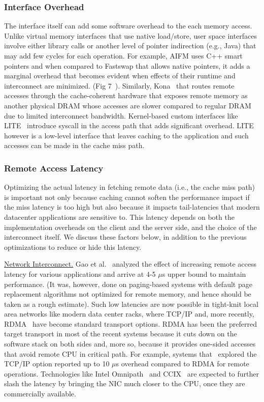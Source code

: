 \subsubsection{Interface Overhead}
The interface itself can add some software overhead 
to the each memory access. Unlike virtual memory 
interfaces that use native load/store, user space 
interfaces involve either library calls or another 
level of pointer indirection (e.g., Java) that may add 
few cycles for each operation. For example, AIFM uses
C++ smart pointers and when compared to Fastswap that 
allows native pointers, it adds a marginal overhead 
that becomes evident when effects of their runtime and 
interconnect are minimized. (Fig 7~\cite{aifm}). 
Similarly, Kona~\cite{kona} that routes remote accesses
through the cache-coherent hardware that exposes remote 
memory as another physical DRAM whose accesses are 
slower compared to regular DRAM due to limited interconnect 
bandwidth. Kernel-based custom interfaces like 
LITE~\cite{literdma} introduce syscall in the access path 
that adds significant overhead. LITE however is a low-level 
interface that leaves caching to the application and 
such accesses can be made in the cache miss path. 


\subsubsection{Remote Access Latency} 
Optimizing the actual latency in fetching remote data 
(i.e., the cache miss path) is important not only because 
caching cannot soften the performance impact if the miss 
latency is too high but also because it impacts tail-latencies 
that modern datacenter applications are sensitive to. 
This latency depends on both the implementation 
overheads on the client and the server side, and the choice of 
the interconnect itself. We discuss these factors below, 
in addition to the previous optimizations to reduce or 
hide this latency.

\vspace{3pt}
\noindent \uline{Network Interconnect.}
Gao et al.~\cite{netdisagg} analyzed the effect of increasing
remote access latency for various applications and arrive at 
4-5 $\mu$s upper bound to maintain performance. (It was, 
however, done on paging-based systems with default page 
replacement algorithms not optimized for remote memory, and 
hence should be taken as a rough estimate).
Such low latencies are now possible in tight-knit
local area networks like modern data center racks,  
where TCP/IP and, more recently, RDMA~\cite{rocev2} have
become standard transport options. 
RDMA has been the preferred target transport 
in most of the recent systems because it cuts down on the 
software stack on both sides and, more so, because it 
provides one-sided accesses that avoid remote CPU in 
critical path. For example, systems that~\cite{literdma,aifm}
explored the TCP/IP option reported up to 10 $\mu$s overhead 
compared to RDMA for remote operations. Technologies 
like Intel Omnipath~\cite{omnipath} and CCIX~\cite{ccix}
are expected to further slash the latency by bringing the NIC 
much closer to the CPU, once they are commercially available. 

